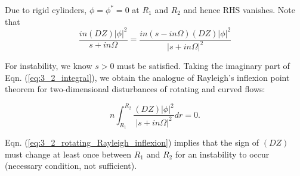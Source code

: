 Due to rigid cylinders, $\phi = \phi^{*} = 0$ at $R_{1}$ and $R_{2}$ and hence RHS vanishes. Note that
\begin{equation}
\frac{in(DZ)|\phi|^{2}}{s + in\Omega} = \frac{in(s - in\Omega)(DZ)|\phi|^{2}}{|s + in\Omega|^{2}} 
\end{equation}

For instability, we know $ s > 0$ must be satisfied. Taking the imaginary part of Eqn. (\ref{eq:3_2_integral}), we obtain the analogue of Rayleigh's inflexion point theorem for two-dimensional disturbances of rotating and curved flows:

\begin{equation}\label{eq:3_2_rotating_Rayleigh_inflexion}
 n\int_{R_{1}}^{R_{2}}\frac{(DZ)|\phi|^{2}}{|s + in\Omega|^{2}} dr = 0. 
\end{equation}

Eqn. (\ref{eq:3_2_rotating_Rayleigh_inflexion}) implies that the sign of $(DZ)$ must change at least once between $R_{1}$ and $R_{2}$ for an instability to occur (necessary condition, not sufficient). 
